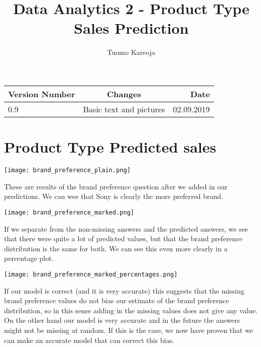 \documentclass[12pt,a4paper,leqno]{report}
\title{Data Analytics 2 - Product Type Sales Prediction}
\author{Tuomo Kareoja}
\date{}
\theoremstyle{plain}
\theoremstyle{definition}
\theoremstyle{remark}
\begin{document}
\maketitle

\begin{table}[h!]
  \begin{center}
    \begin{tabular}{l|c|r}
      \textbf{Version Number} & \textbf{Changes} & \textbf{Date} \\
      \hline
      0.9 & Basic text and pictures & 02.09.2019\\
    \end{tabular}
  \end{center}
\end{table}

\newpage

\section{Product Type Predicted sales}

\bigskip
{
    \centering
    \texttt{[image: brand\_preference\_plain.png]}
    \par
}
\bigskip

These are results of the brand preference question after we added in our predictions. We can wee that Sony
is clearly the more preferred brand.

\bigskip
{
    \centering
    \texttt{[image: brand\_preference\_marked.png]}
    \par
}
\bigskip

If we separate from the non-missing answers and the predicted answers, we see
that there were quite a lot of predicted values, but that the brand preference distribution
is the same for both. We can see this even more clearly in a percentage plot.

\bigskip
{
    \centering
    \texttt{[image: brand\_preference\_marked\_percentages.png]}
    \par
}
\bigskip

If our model is correct (and it is very accurate) this suggests that the missing brand preference values
do not bias our estimate of the brand preference distribution, so in this sense adding in the missing
values does not give any value. On the other hand our model is very accurate and in the future
the answers might not be missing at random. If this is the case, we now have proven that we can make
an accurate model that can correct this bias.
\end{document}
